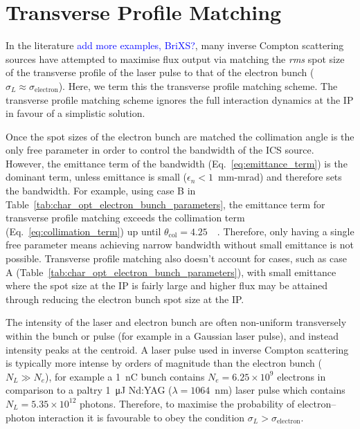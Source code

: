\documentclass[../main.tex]{subfiles}
\begin{document}
\section{Transverse Profile Matching}
\label{sec:transverse_profile_matching}

In the literature \cite{akagi2016narrow,deitrick2018high,jacquet2015radiation} \textcolor{blue}{add more examples, BriXS?}, many inverse Compton scattering sources have attempted to maximise flux output via matching the \textit{rms} spot size of the transverse profile of the laser pulse to that of the electron bunch ($\sigma_{L}\approx\sigma_{\mathrm{electron}}$). Here, we term this the transverse profile matching scheme. The transverse profile matching scheme ignores the full interaction dynamics at the IP in favour of a simplistic solution. 

Once the spot sizes of the electron bunch are matched the collimation angle is the only free parameter in order to control the bandwidth of the ICS source. However, the emittance term of the bandwidth (Eq.~\ref{eq:emittance_term}) is the dominant term, unless emittance is small ($\epsilon_{n} < 1$~\si{\milli\meter}-\si{\milli\radian}) and therefore sets the bandwidth. For example, using case B in Table~\ref{tab:char_opt_electron_bunch_parameters}, the emittance term for transverse profile matching exceeds the collimation term (Eq.~\ref{eq:collimation_term}) up until $\theta_{\mathrm{col}} = 4.25$~\si{\milli\rad}. Therefore, only having a single free parameter means achieving narrow bandwidth without small emittance is not possible. Transverse profile matching also doesn't account for cases, such as case A (Table~\ref{tab:char_opt_electron_bunch_parameters}), with small emittance where the spot size at the IP is fairly large and higher flux may be attained through reducing the electron bunch spot size at the IP. 

The intensity of the laser and electron bunch are often non-uniform transversely within the bunch or pulse (for example in a Gaussian laser pulse), and instead intensity peaks at the centroid. A laser pulse used in inverse Compton scattering is typically more intense by orders of magnitude than the electron bunch ($N_{L} \gg N_{e}$), for example a 1~\si{\nano\coulomb} bunch contains $N_{e} = 6.25\times 10^{9}$ electrons in comparison to a paltry 1~\si{\micro\joule} Nd:YAG ($\lambda = 1064$~\si{\nano\meter}) laser pulse which contains $N_{L} = 5.35\times 10^{12}$ photons. Therefore, to maximise the probability of electron--photon interaction it is favourable to obey the condition $\sigma_{L} > \sigma_{\mathrm{electron}}$.
\end{document}
